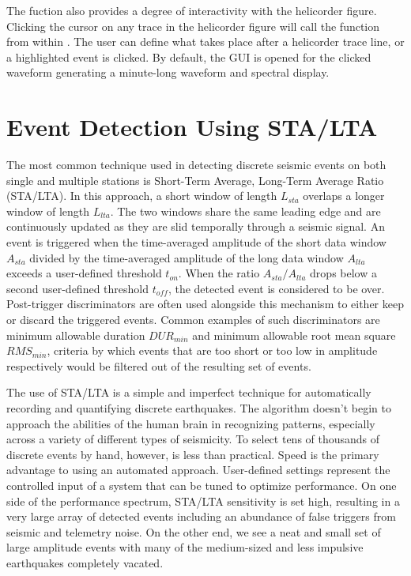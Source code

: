 \documentclass[11pt]{article}
\begin{document}
The  fuction also provides a degree of interactivity with the helicorder figure. Clicking the cursor on any trace in the helicorder figure will call the function  from within . The user can define what takes place after a helicorder trace line, or a highlighted event is clicked. By default, the GUI  is opened for the clicked waveform generating a minute-long waveform and spectral display.

\clearpage

\section{Event Detection Using STA/LTA}

The most common technique used in detecting discrete seismic events on both single and multiple stations is Short-Term Average, Long-Term Average Ratio (STA/LTA). In this approach, a short window of length $L_{sta}$ overlaps a longer window of length $L_{lta}$. The two windows share the same leading edge and are continuously updated as they are slid temporally through a seismic signal. An event is triggered when the time-averaged amplitude of the short data window $A_{sta}$ divided by the time-averaged amplitude of the long data window $A_{lta}$ exceeds a user-defined threshold $t_{on}$. When the ratio $A_{sta}/A_{lta}$ drops below a second user-defined threshold $t_{off}$, the detected event is considered to be over. Post-trigger discriminators are often used alongside this mechanism to either keep or discard the triggered events. Common examples of such discriminators are minimum allowable duration $DUR_{min}$ and minimum allowable root mean square $RMS_{min}$, criteria by which events that are too short or too low in amplitude respectively would be filtered out of the resulting set of events.

The use of STA/LTA is a simple and imperfect technique for automatically recording and quantifying discrete earthquakes. The algorithm doesn't begin to approach the abilities of the human brain in recognizing patterns, especially across a variety of different types of seismicity. To select tens of thousands of discrete events by hand, however, is less than practical. Speed is the primary advantage to using an automated approach. User-defined settings represent the controlled input of a system that can be tuned to optimize performance. On one side of the performance spectrum, STA/LTA sensitivity is set high, resulting in a very large array of detected events including an abundance of false triggers from seismic and telemetry noise. On the other end, we see a neat and small set of large amplitude events with many of the medium-sized and less impulsive earthquakes completely vacated. 
\end{document}
